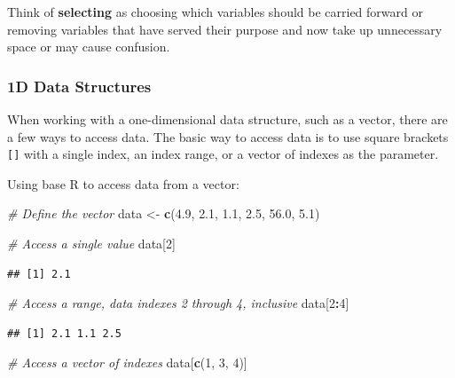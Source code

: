 \documentclass[
]{book}
\newenvironment{Shaded}{\begin{snugshade}}{\end{snugshade}}
\newcommand{\CommentTok}[1]{\textcolor[rgb]{0.56,0.35,0.01}{\textit{#1}}}
\newcommand{\DecValTok}[1]{\textcolor[rgb]{0.00,0.00,0.81}{#1}}
\newcommand{\FloatTok}[1]{\textcolor[rgb]{0.00,0.00,0.81}{#1}}
\newcommand{\FunctionTok}[1]{\textcolor[rgb]{0.13,0.29,0.53}{\textbf{#1}}}
\newcommand{\NormalTok}[1]{#1}
\newcommand{\OtherTok}[1]{\textcolor[rgb]{0.56,0.35,0.01}{#1}}
\newcommand{\SpecialCharTok}[1]{\textcolor[rgb]{0.81,0.36,0.00}{\textbf{#1}}}
\begin{document}
Think of \textbf{selecting} as choosing which variables should be carried forward or removing variables that have served their purpose and now take up unnecessary space or may cause confusion.

\subsubsection{1D Data Structures}\label{sec:selecting1d}

When working with a one-dimensional data structure, such as a vector, there are a few ways to access data. The basic way to access data is to use square brackets \texttt{{[}{]}} with a single index, an index range, or a vector of indexes as the parameter.

Using base R to access data from a vector:

\begin{Shaded}
\begin{Highlighting}[]
\CommentTok{\# Define the vector}
\NormalTok{data }\OtherTok{\textless{}{-}} \FunctionTok{c}\NormalTok{(}\FloatTok{4.9}\NormalTok{, }\FloatTok{2.1}\NormalTok{, }\FloatTok{1.1}\NormalTok{, }\FloatTok{2.5}\NormalTok{, }\FloatTok{56.0}\NormalTok{, }\FloatTok{5.1}\NormalTok{)}

\CommentTok{\# Access a single value}
\NormalTok{data[}\DecValTok{2}\NormalTok{]}
\end{Highlighting}
\end{Shaded}

\begin{verbatim}
## [1] 2.1
\end{verbatim}

\begin{Shaded}
\begin{Highlighting}[]
\CommentTok{\# Access a range, data indexes 2 through 4, inclusive}
\NormalTok{data[}\DecValTok{2}\SpecialCharTok{:}\DecValTok{4}\NormalTok{]}
\end{Highlighting}
\end{Shaded}

\begin{verbatim}
## [1] 2.1 1.1 2.5
\end{verbatim}

\begin{Shaded}
\begin{Highlighting}[]
\CommentTok{\# Access a vector of indexes}
\NormalTok{data[}\FunctionTok{c}\NormalTok{(}\DecValTok{1}\NormalTok{, }\DecValTok{3}\NormalTok{, }\DecValTok{4}\NormalTok{)]}
\end{Highlighting}
\end{Shaded}
\end{document}

